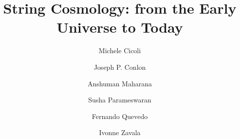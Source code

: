 \documentclass[final,3p,times]{elsarticle}
\begin{document}
\begin{frontmatter}


\title{{\bf String Cosmology: from the Early Universe to Today}}

\author[bol,infn]{\small Michele Cicoli}

\author[ox]{\small Joseph P. Conlon }

\author[alla]{\small Anshuman Maharana}

\author[liv]{\small Susha Parameswaran}

\author[cam]{\small Fernando Quevedo}


\author[swan]{\small Ivonne Zavala}


\address[bol]{%
        Dipartimento di Fisica e Astronomia, Universit\`a di Bologna, via Irnerio 46, 40126 Bologna, Italy.%
}

\address[infn]{INFN, Sezione di Bologna, viale Berti Pichat 6/2, 40127 Bologna, Italy.}


\address[ox]{%
        Rudolf Peierls Centre for Theoretical Physics, Beecroft Building, Clarendon Laboratory, University of Oxford, Parks Road, OX1 3PU, UK
        }

\address[alla]{%
        Harish Chandra Research Institute, A CI of Homi Bhabha National Institute, Chattnag Road, Jhunsi, Allahabad - 211019, India
}


\address[liv]{%
        Department of Mathematical Sciences, University of Liverpool, Liverpool L69 7ZL
}


\address[cam]{%
        DAMTP, University of Cambridge, Wilberforce Road, Cambridge, CB3 0WA, UK
}


\address[swan]{%
        Department of Physics, Swansea University, Swansea, SA2 8PP, UK
}

    




\end{frontmatter}
\end{document}
